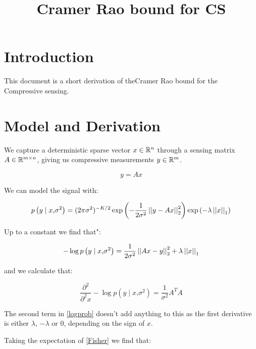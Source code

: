 \documentclass[12pt, a4paper, titlepage]{article}
\begin{document}
\title{Cramer Rao bound for CS}
\maketitle

\section{Introduction}
This document is a short derivation of theCramer Rao bound for the Compressive sensing.

\section{Model and Derivation}

We capture a deterministic sparse vector \(x \in {\mathbb{R}}^n\)  through a sensing matrix \(A \in {\mathbb{R}}^{m \times n}\), giving us compressive measurements \(y \in {\mathbb{R}}^m\).

\begin{equation}
y = Ax
\end{equation}

We can model the signal with:

\begin{equation}
p \left(y \mid x \text{,} \sigma^2 \right) = (2 \pi \sigma^2)^{-K/2} \exp{\left(- \frac{1}{2 \sigma^2} \left|\left|y - Ax\right|\right|_{2}^{2} \right)}\exp{(-\lambda\left|\left|x\right|\right|_1)} 
\end{equation}

Up to a constant we find that":

\begin{equation}
-\log{p \left(y \mid x \text{,} \sigma^2 \right) }=\frac{1}{2\sigma^2}\left|\left|Ax-y\right|\right|_2^2 + \lambda\left|\left|x\right|\right|_1
\end{equation}
\label{logprob}

and we calculate that:

\begin{equation}
\frac{\partial^2}{\partial^2x}-\log{p \left(y \mid x \text{,} \sigma^2 \right) } = \frac{1}{\sigma^2}A^T A
\end{equation}
\label{Fisher}

\begin{remark}
The second term in \eqref{logprob} doesn't add anything to this as the first derivative is either \(\lambda\), \(-\lambda\) or \(0\), depending on the sign of \(x\).
\end{remark}

Taking the expectation of \eqref{Fisher} we find that:
\end{document}

